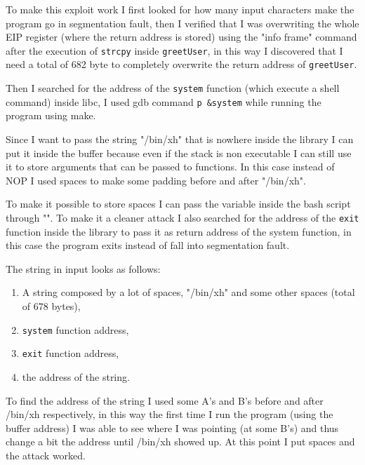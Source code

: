 \documentclass[a4paper,12pt]{article}
\begin{document}
To make this exploit work I first looked for how many input characters make the program go in segmentation fault, then I verified that I was overwriting the whole EIP register (where the return address is stored) using the "info frame" command after the execution of \texttt{strcpy} inside \texttt{greetUser}, in this way I discovered that I need a total of 682 byte to completely overwrite the return address of \texttt{greetUser}.

Then I searched for the address of the \texttt{system} function (which execute a shell command) inside libc, I used gdb command \texttt{p \&system} while running the program using make.

Since I want to pass the string "/bin/xh" that is nowhere inside the library I can put it inside the buffer because even if the stack is non executable I can still use it to store arguments that can be passed to functions. In this case instead of NOP I used spaces to make some padding before and after "/bin/xh".

To make it possible to store spaces I can pass the variable inside the bash script through "". To make it a cleaner attack I also searched for the address of the \texttt{exit} function inside the library to pass it as return address of the system function, in this case the program exits instead of fall into segmentation fault.

The string in input looks as follows:
\begin{enumerate}
\item A string composed by a lot of spaces, "/bin/xh" and some other spaces (total of 678 bytes),
\item \texttt{system} function address,
\item \texttt{exit} function address,
\item the address of the string.
\end{enumerate}

To find the address of the string I used some A's and B's before and after /bin/xh respectively, in this way the first time I run the program (using the buffer address) I was able to see where I was pointing (at some B's) and thus change a bit the address until /bin/xh showed up. At this point I put spaces and the attack worked.




\end{document}
